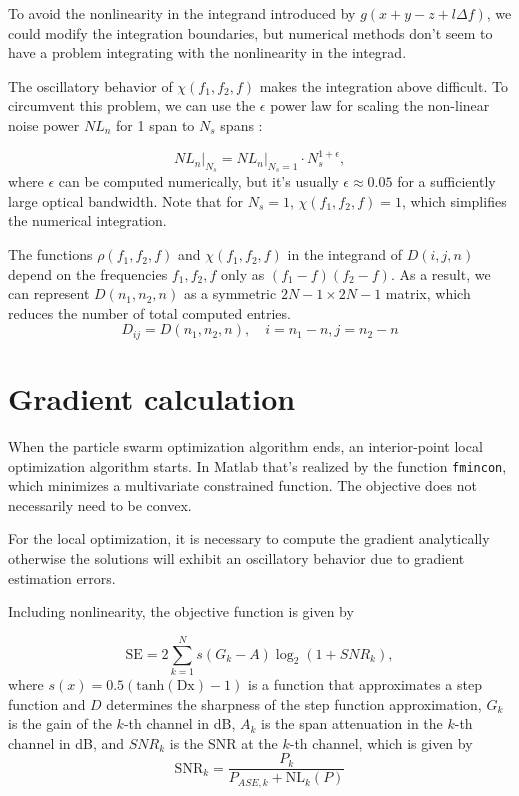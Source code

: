 \documentclass[a4paper]{article}
\begin{document}
To avoid the nonlinearity in the integrand introduced by $g(x+y-z+l\Delta f)$, we could modify the integration boundaries, but numerical methods don't seem to have a problem integrating with the nonlinearity in the integrad.

The oscillatory behavior of $\chi(f_1, f_2, f)$ makes the integration above difficult. To circumvent this problem, we can use the $\epsilon$ power law for scaling the non-linear noise power $NL_n$ for 1 span to $N_s$ spans \cite{Poggiolini2012}:

\begin{equation}
	NL_n\Big|_{N_s} = NL_n\Big|_{N_s = 1}\cdot N_s^{1+\epsilon},
\end{equation}
where $\epsilon$ can be computed numerically, but it's usually $\epsilon \approx 0.05$ for a sufficiently large optical bandwidth. Note that for $N_s = 1$, $\chi(f_1, f_2, f) = 1$, which simplifies the numerical integration.
 
The functions $\rho(f_1, f_2, f)$ and $\chi(f_1, f_2, f)$ in the integrand of $D(i, j, n)$ depend on the frequencies $f_1, f_2, f$ only as $(f_1-f)(f_2-f)$. As a result, we can represent $D(n_1, n_2, n)$ as a symmetric $2N-1\times 2N-1$ matrix, which reduces the number of total computed entries.
\begin{equation}
	D_{ij} = D(n_1, n_2, n), \quad i = n_1 - n, j = n_2 - n
\end{equation}

\section{Gradient calculation}

When the particle swarm optimization algorithm ends, an interior-point local optimization algorithm starts. In Matlab that's realized by the function \texttt{fmincon}, which minimizes a multivariate constrained function. The objective does not necessarily need to be convex.

For the local optimization, it is necessary to compute the gradient analytically otherwise the solutions will exhibit an oscillatory behavior due to gradient estimation errors.

Including nonlinearity, the objective function is given by

\begin{equation} \label{eq:grad:SE}
	\mathrm{SE} = 2\sum_{k = 1}^N s(G_k - A)\log_2(1 +  SNR_k),
\end{equation}
where $s(x) = 0.5(\mathrm{tanh(Dx)}-1)$ is a function that approximates a step function and $D$ determines the sharpness of the step function approximation, $G_k$ is the gain of the $k$-th channel in dB, $A_k$ is the span attenuation in the $k$-th channel in dB, and $SNR_k$ is the SNR at the $k$-th channel, which is given by
\begin{equation}
	\mathrm{SNR}_k = \frac{P_k}{P_{ASE, k} + \mathrm{NL}_k(P)}
\end{equation}
\end{document}
